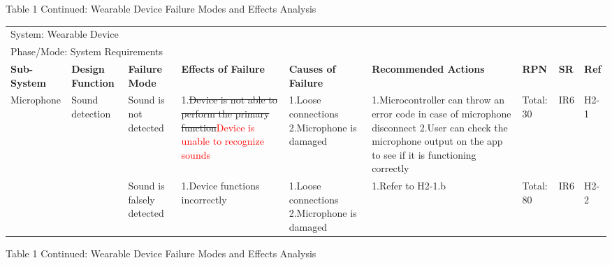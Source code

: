 \documentclass[12pt, titlepage]{article}
\begin{document}
\begin{landscape}
\begin{table}[H]
\begin{tabular}{| p{} | p{}  | p{} | p{} | p{} | p{} | p{} | p{} | p{} |}
        \end{tabular}

\end{table}
\begin{table}[H]
    \centering
        Table 1 Continued: Wearable Device Failure Modes and Effects Analysis

        \begin{tabular}{| p{} | p{}  | p{} | p{} | p{} | p{} | p{} | p{} | p{} |}
        \hline
        
        \multicolumn{9}{|l|}{System: Wearable Device} \\
        \multicolumn{9}{|l|}{Phase/Mode: System Requirements} \\ \hline
        \textbf{Sub-System} & \textbf{Design Function} & \textbf{Failure Mode} & \textbf{Effects of Failure} & \textbf{Causes of Failure} & \textbf{Recommended Actions} & \textbf{RPN} & \textbf{SR} & \textbf{Ref} \\ \hline
    
        Microphone & Sound detection & Sound is not detected & 1.\sout{Device is not able to perform the primary function}\textcolor{red}{Device is unable to recognize sounds}  & 1.Loose connections \newline 2.Microphone is damaged  & 1.Microcontroller can throw an error code in case of microphone disconnect \newline 2.User can check the microphone output on the app to see if it is functioning correctly & Total: 30  & IR6  & H2-1 \\ \cline{3-9}
    
         & & Sound is falsely detected & 1.Device functions incorrectly & 1.Loose connections \newline 2.Microphone is damaged & 1.Refer to H2-1.b & Total: 80 & IR6 & H2-2 \\ \hline
     
        \end{tabular}

\end{table}
\begin{table}[H]
    \centering
        Table 1 Continued: Wearable Device Failure Modes and Effects Analysis
        \begin{tabular}{| p{} | p{}  | p{} | p{} | p{} | p{} | p{} | p{} | p{} |}
            \hline
        

\end{tabular}
\end{table}
\end{landscape}
\end{document}

